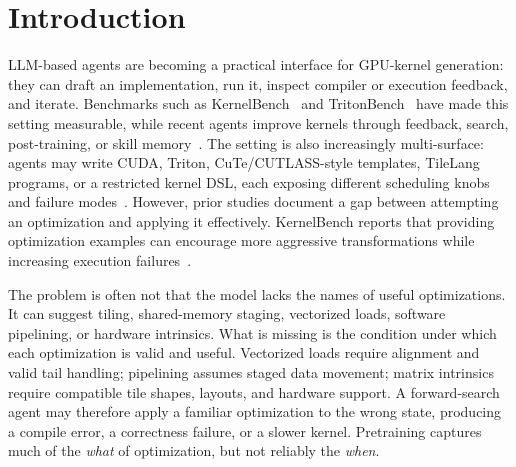 \section{Introduction}
\label{sec:intro}
LLM-based agents are becoming a practical interface for GPU-kernel generation: they can draft an implementation, run it, inspect compiler or execution feedback, and iterate. Benchmarks such as KernelBench~\citep{kernelbench} and TritonBench~\citep{tritonbench} have made this setting measurable, while recent agents improve kernels through feedback, search, post-training, or skill memory~\citep{gpu_kernel_scientist,geak,sakana_cuda_engineer,kernel_smith,kernel_skill,adaexplore}. The setting is also increasingly multi-surface: agents may write CUDA, Triton, CuTe/CUTLASS-style templates, TileLang programs, or a restricted kernel DSL, each exposing different scheduling knobs and failure modes~\citep{tritonbench,geak,cutegen,tritonforge,hari2026improving,chu2025gpu,qu2026two}. However, prior studies document a gap between attempting an optimization and applying it effectively. KernelBench reports that providing optimization examples can encourage more aggressive transformations while increasing execution failures~\citep{kernelbench}. 

The problem is often not that the model lacks the names of useful optimizations. It can suggest tiling, shared-memory staging, vectorized loads, software pipelining, or hardware intrinsics. What is missing is the condition under which each optimization is valid and useful. Vectorized loads require alignment and valid tail handling; pipelining assumes staged data movement; matrix intrinsics require compatible tile shapes, layouts, and hardware support. A forward-search agent may therefore apply a familiar optimization to the wrong state, producing a compile error, a correctness failure, or a slower kernel. Pretraining captures much of the \emph{what} of optimization, but not reliably the \emph{when}.

